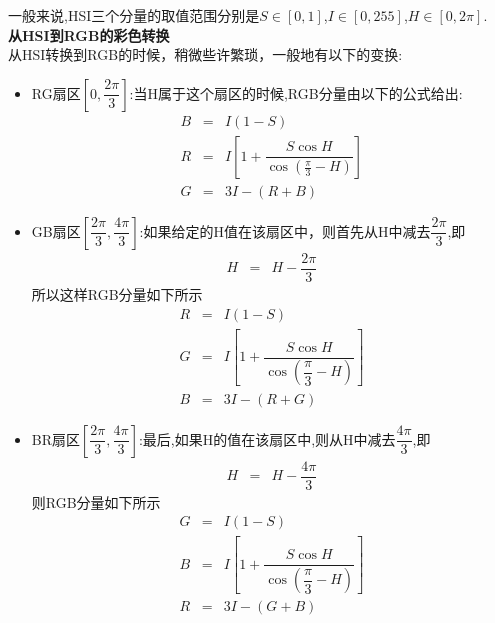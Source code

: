 \documentclass[UTF8,a4paper,10pt]{ctexart}
\begin{document}
\begin{flushleft}
        \hspace{2em}一般来说,HSI三个分量的取值范围分别是$S\in{[0,1]}$,$I\in{[0,255]}$,$H\in{[0,2\pi]}$.\\
        \heiti\textbf{从HSI到RGB的彩色转换}\songti\\
        \hspace{2em}从HSI转换到RGB的时候，稍微些许繁琐，一般地有以下的变换:\\
        \begin{itemize}
            \item RG扇区$\left[0,\dfrac{2\pi}{3}\right]$:当H属于这个扇区的时候,RGB分量由以下的公式给出:
            \begin{eqnarray}
                B&=&I(1-S)\nonumber\\
                R&=&I\left[1+\dfrac{S\cos{H}}{\cos\left(\frac{\pi}{3}-H\right)}\right]\nonumber\\
                G&=&3I-(R+B)\nonumber
            \end{eqnarray}
            \item GB扇区$\left[\dfrac{2\pi}{3},\dfrac{4\pi}{3}\right]$:如果给定的H值在该扇区中，则首先从H中减去$\dfrac{2\pi}{3}$,即
            \begin{eqnarray}
                H&=&H-\dfrac{2\pi}{3}\nonumber
            \end{eqnarray}
            所以这样RGB分量如下所示
            \begin{eqnarray}
                R&=&I(1-S)\nonumber\\
                G&=&I\left[1+\dfrac{S\cos{H}}{\cos\left(\dfrac{\pi}{3}-H\right)}\right]\nonumber\\
                B&=&3I-(R+G)\nonumber
            \end{eqnarray}
            \item BR扇区$\left[\dfrac{2\pi}{3},\dfrac{4\pi}{3}\right]$:最后,如果H的值在该扇区中,则从H中减去$\dfrac{4\pi}{3}$,即
            \begin{eqnarray}
                H&=&H-\dfrac{4\pi}{3}\nonumber
            \end{eqnarray}
            则RGB分量如下所示
            \begin{eqnarray}
                G&=&I(1-S)\nonumber\\
                B&=&I\left[1+\dfrac{S\cos{H}}{\cos\left(\dfrac{\pi}{3}-H\right)}\right]\nonumber\\
                R&=&3I-(G+B)\nonumber
            \end{eqnarray}
        \end{itemize}

\end{flushleft}
\end{document}
